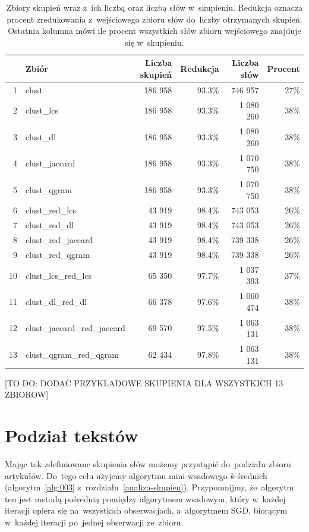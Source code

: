 \documentclass{praca1}
\begin{document}
\begin{table}[!h]
\centering
\begin{tabular}{|rl|rr|rr|}
  \hline
 & Zbiór & Liczba skupień & Redukcja & Liczba słów & Procent \\ 
  \hline
1 & clust & 186 958 & 93.3\% & 746 957 & 27\% \\ 
  2 & clust\_lcs & 186 958 & 93.3\% & 1 080 260 & 38\% \\ 
  3 & clust\_dl & 186 958 & 93.3\% & 1 080 260 & 38\% \\ 
  4 & clust\_jaccard & 186 958 & 93.3\% & 1 070 750 & 38\% \\ 
  5 & clust\_qgram & 186 958 & 93.3\% & 1 070 750 & 38\% \\ \hline
  6 & clust\_red\_lcs & 43 919 & 98.4\% & 743 053 & 26\% \\ 
  7 & clust\_red\_dl & 43 919 & 98.4\% & 743 053 & 26\% \\ 
  8 & clust\_red\_jaccard & 43 919 & 98.4\% & 739 338 & 26\% \\ 
  9 & clust\_red\_qgram & 43 919 & 98.4\% & 739 338 & 26\% \\ \hline
  10 & clust\_lcs\_red\_lcs & 65 350 & 97.7\% & 1 037 393 & 37\% \\ 
  11 & clust\_dl\_red\_dl & 66 378 & 97.6\% & 1 060 474 & 38\% \\ 
  12 & clust\_jaccard\_red\_jaccard & 69 570 & 97.5\% & 1 063 131 & 38\% \\ 
  13 & clust\_qgram\_red\_qgram & 62 434 & 97.8\% & 1 063 131 & 38\% \\ 
   \hline
\end{tabular}
\caption{Zbiory skupień wraz z~ich liczbą oraz liczbą słów w~skupieniu. Redukcja oznacza procent zredukowania z~wejściowego zbioru słów do~liczby otrzymanych skupień. Ostatnia kolumna mówi ile procent wszystkich słów zbioru wejściowego znajduje się w~skupieniu.}
\label{tab:005}
\end{table}

[TO DO: DODAC PRZYKLADOWE SKUPIENIA DLA WSZYSTKICH 13 ZBIOROW]

\section{Podział tekstów}

Mając tak zdefiniowane skupienia słów możemy przystąpić do~podziału zbioru artykułów. Do~tego celu użyjemy algorytmu mini-wsadowego $k$-średnich (algorytm~\ref{alg:003} z~rozdziału~\ref{analiza-skupien}). Przypomnijmy, że~algorytm ten jest metodą pośrednią pomiędzy algorytmem wsadowym, który w~każdej iteracji opiera się na~wszystkich obserwacjach, a~algorytmem SGD, biorącym w~każdej iteracji po~jednej obserwacji ze~zbioru. 
\end{document}

